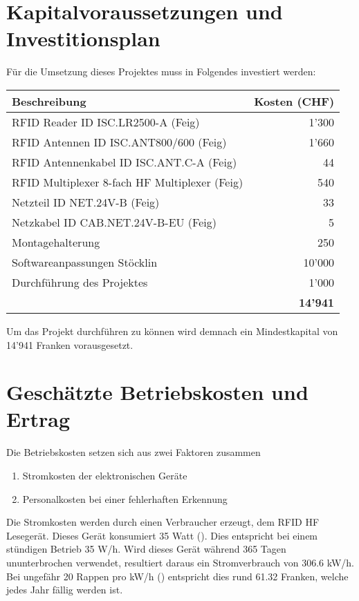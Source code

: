 \chapter{Kapitalvoraussetzungen und Investitionsplan}
Für die Umsetzung dieses Projektes muss in Folgendes investiert werden:

\vspace{1em}

\begin{tabularx}{\textwidth}{|X|r|}
	\hline
	\textbf{Beschreibung} & \textbf{Kosten (CHF)} \\
	\hline
	RFID Reader ID ISC.LR2500-A (Feig) & 1'300 \\
	\hline
	RFID Antennen ID ISC.ANT800/600 (Feig) & 1'660 \\
	\hline
	RFID Antennenkabel ID ISC.ANT.C-A (Feig) & 44 \\
	\hline
	RFID Multiplexer 8-fach HF Multiplexer (Feig) & 540 \\
	\hline
	Netzteil ID NET.24V-B (Feig) & 33 \\
	\hline
	Netzkabel ID CAB.NET.24V-B-EU (Feig) & 5 \\
	\hline
	Montagehalterung & 250 \\
	\hline
	Softwareanpassungen Stöcklin & 10'000 \\
	\hline
	Durchführung des Projektes & 1'000 \\
	\hline
	\hline
	 & \textbf{14'941} \\
	 \hline
\end{tabularx}

\vspace{1em}

Um das Projekt durchführen zu können wird demnach ein Mindestkapital von 14'941 Franken vorausgesetzt.

\chapter{Geschätzte Betriebskosten und Ertrag}
Die Betriebskosten setzen sich aus zwei Faktoren zusammen
\begin{enumerate}
	\item Stromkosten der elektronischen Geräte
	\item Personalkosten bei einer fehlerhaften Erkennung
\end{enumerate}

Die Stromkosten werden durch einen Verbraucher erzeugt, dem RFID HF Lesegerät. Dieses Gerät konsumiert 35 Watt (\cite{DatenblattRFIDReader}). Dies entspricht bei einem stündigen Betrieb 35 W/h. Wird dieses Gerät während 365 Tagen ununterbrochen verwendet, resultiert daraus ein Stromverbrauch von 306.6 kW/h. Bei ungefähr 20 Rappen pro kW/h (\cite{StromPreisAdmin2019}) entspricht dies rund 61.32 Franken, welche jedes Jahr fällig werden ist.

